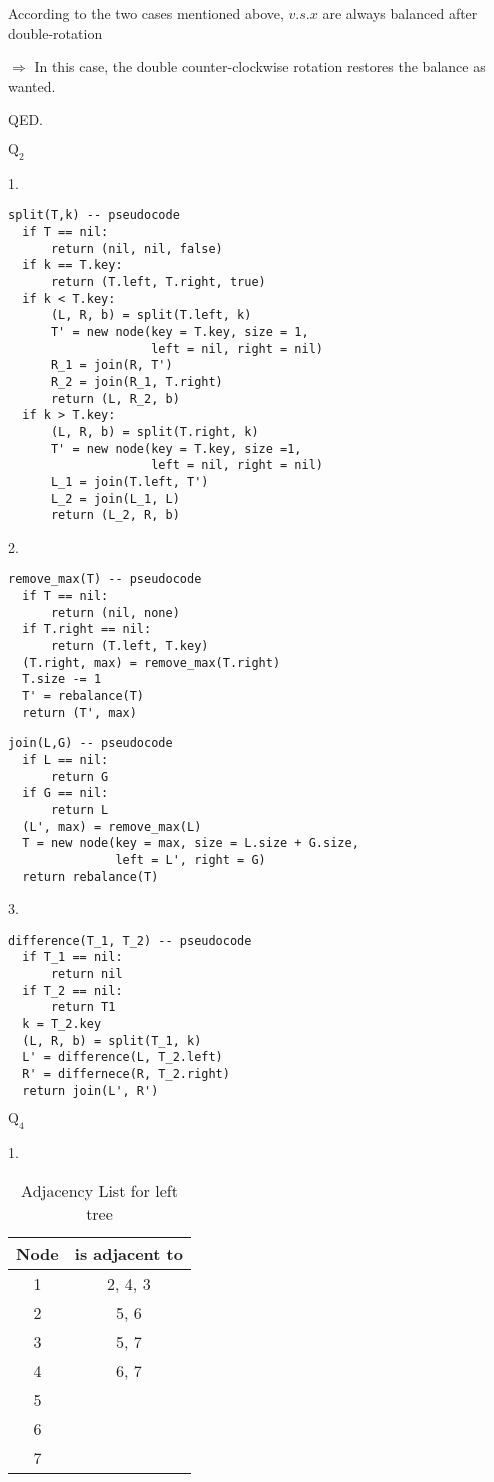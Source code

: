 \documentclass[12pt]{article}
\begin{document}
According to the two cases mentioned above,  $v.s.x$ are always balanced after double-rotation

$\Rightarrow$ In this case, the double counter-clockwise rotation restores the balance as wanted.

QED.

\newpage
$\text{Q}_{2}$

1.
\begin{verbatim}
split(T,k) -- pseudocode
  if T == nil:
      return (nil, nil, false) 
  if k == T.key:
      return (T.left, T.right, true)
  if k < T.key:
      (L, R, b) = split(T.left, k)
      T' = new node(key = T.key, size = 1, 
                    left = nil, right = nil)
      R_1 = join(R, T')
      R_2 = join(R_1, T.right)
      return (L, R_2, b)
  if k > T.key:
      (L, R, b) = split(T.right, k)
      T' = new node(key = T.key, size =1, 
                    left = nil, right = nil)
      L_1 = join(T.left, T')
      L_2 = join(L_1, L)
      return (L_2, R, b)
\end{verbatim}

2.
\begin{verbatim}
remove_max(T) -- pseudocode
  if T == nil:
      return (nil, none)
  if T.right == nil:
      return (T.left, T.key)
  (T.right, max) = remove_max(T.right)
  T.size -= 1
  T' = rebalance(T)
  return (T', max)
\end{verbatim}

\begin{verbatim}
join(L,G) -- pseudocode
  if L == nil:
      return G
  if G == nil:
      return L
  (L', max) = remove_max(L)
  T = new node(key = max, size = L.size + G.size,
               left = L', right = G)
  return rebalance(T)
\end{verbatim}

3.
\begin{verbatim}
difference(T_1, T_2) -- pseudocode
  if T_1 == nil:
      return nil
  if T_2 == nil:
      return T1
  k = T_2.key
  (L, R, b) = split(T_1, k)
  L' = difference(L, T_2.left)
  R' = differnece(R, T_2.right)
  return join(L', R')
\end{verbatim}

\newpage
$\text{Q}_{4}$

1.
\begin{table}[h]
    \centering
    \begin{tabular}{c|c}
        Node & is adjacent to \\ \hline
        1    & 2, 4, 3  \\
        2    & 5, 6   \\
        3    & 5, 7  \\
        4    & 6, 7   \\
        5    &       \\
        6    &       \\
        7    &       
    \end{tabular}
    \caption{Adjacency List for left tree}
\end{table}
\end{document}
